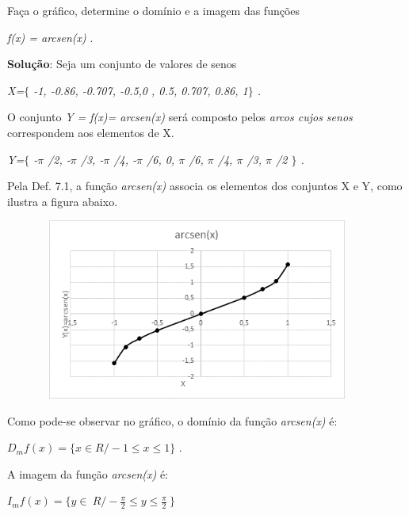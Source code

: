 \begin{texemplo}
Faça o gráfico, determine o domínio e a imagem das funções

 \textit{f(x) = arcsen(x) }.

\textbf{Solução}: Seja um conjunto de valores de senos

\textit{X=$ \{ $ -1, -0.86, -0.707, -0.5,0 , 0.5, 0.707, 0.86, 1$ \} $ .}

O conjunto \textit{Y = f(x)= arcsen(x)}    será composto pelos \textit{arcos cujos senos} \tab correspondem aos elementos de X.

\textit{Y=$ \{ $ -$ \pi $ /2, -$ \pi $ /3, -$ \pi $ /4, -$ \pi $ /6, 0, $ \pi $ /6, $ \pi $ /4, $ \pi $ /3, $ \pi $ /2 $ \} $ .}

Pela Def. 7.1, a função \textit{arcsen(x)}  associa os elementos dos conjuntos X e Y, como ilustra a figura abaixo.

\begin{figure}[H]
    \begin{Center}
        \includegraphics[width=4.15in,height=2.34in]{capitulos/trigonometria_e_funcoes_trigonometricas/media/image47.png}
    \end{Center}
\end{figure}

Como pode-se observar no gráfico, o domínio da função \textit{arcsen(x)} é:

 \( D_{m}f \left( x \right) = \{ x \in  R /-1  \leq x \leq 1 \}  \)  .

A imagem da função \textit{arcsen(x)}  é:

 \( I_{m}f \left( x \right) = \{ y \in ~R  / -\frac{ \pi }{2}  \leq  y  \leq  \frac{ \pi }{2}~  \}  \)   \qedsymbol
\end{texemplo}

